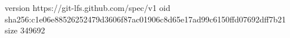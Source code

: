 version https://git-lfs.github.com/spec/v1
oid sha256:c1e06e88526252479d3606f87ac01906c8d65e17ad99c6150ffd07692dff7b21
size 349692
